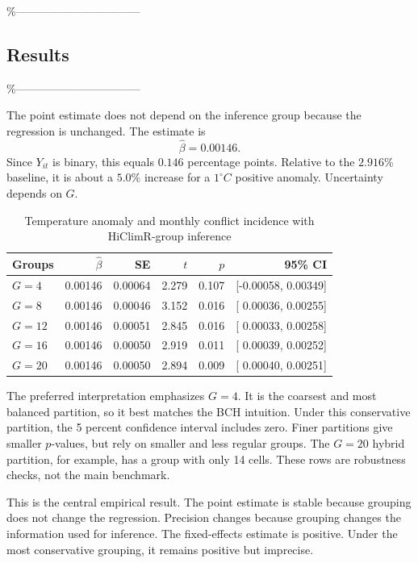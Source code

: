 \documentclass[
]{article}
\begin{document}
\%---------------------------------

\subsection{Results}

\%---------------------------------

The point estimate does not depend on the inference group because the
regression is unchanged. The estimate is \[
\widehat\beta=0.00146.
\] Since \(Y_{it}\) is binary, this equals \(0.146\) percentage points.
Relative to the \(2.916\%\) baseline, it is about a \(5.0\%\) increase
for a \(1^\circ C\) positive anomaly. Uncertainty depends on \(G\).

\begin{table}[H]
\centering
\caption{Temperature anomaly and monthly conflict incidence with HiClimR-group inference}
\label{tab:bch-results}
\begin{tabular}{lrrrrr}
\toprule
Groups & \(\widehat\beta\) & SE & \(t\) & \(p\) & 95\% CI\\
\midrule
\(G=4\)  & 0.00146 & 0.00064 & 2.279 & 0.107 & [-0.00058, 0.00349]\\
\(G=8\)  & 0.00146 & 0.00046 & 3.152 & 0.016 & [ 0.00036, 0.00255]\\
\(G=12\) & 0.00146 & 0.00051 & 2.845 & 0.016 & [ 0.00033, 0.00258]\\
\(G=16\) & 0.00146 & 0.00050 & 2.919 & 0.011 & [ 0.00039, 0.00252]\\
\(G=20\) & 0.00146 & 0.00050 & 2.894 & 0.009 & [ 0.00040, 0.00251]\\
\bottomrule
\end{tabular}
\end{table}

The preferred interpretation emphasizes \(G=4\). It is the coarsest and
most balanced partition, so it best matches the BCH intuition. Under
this conservative partition, the 5 percent confidence interval includes
zero. Finer partitions give smaller \(p\)-values, but rely on smaller
and less regular groups. The \(G=20\) hybrid partition, for example, has
a group with only 14 cells. These rows are robustness checks, not the
main benchmark.

This is the central empirical result. The point estimate is stable
because grouping does not change the regression. Precision changes
because grouping changes the information used for inference. The
fixed-effects estimate is positive. Under the most conservative
grouping, it remains positive but imprecise.
\end{document}
